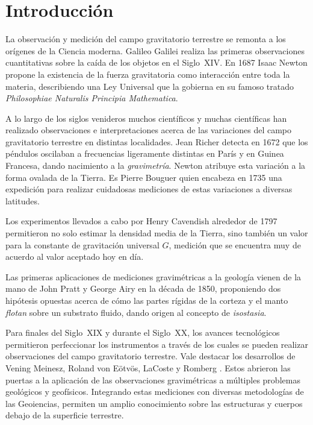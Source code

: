 \chapter{Introducción}

La observación y medición del campo gravitatorio terrestre se remonta a los
orígenes de la Ciencia moderna. Galileo Galilei realiza las primeras
observaciones cuantitativas sobre la caída de los objetos en el Siglo~XIV. En
1687 Isaac Newton propone la existencia de la fuerza gravitatoria como
interacción entre toda la materia, describiendo una Ley Universal que la
gobierna en su famoso tratado \emph{Philosophiae Naturalis Principia
Mathematica}.

A lo largo de los siglos venideros muchos científicos y muchas científicas
han realizado observaciones e interpretaciones acerca de las variaciones del
campo gravitatorio terrestre en distintas localidades. Jean Richer detecta en
1672 que los péndulos oscilaban a frecuencias ligeramente distintas en París
y en Guinea Francesa, dando nacimiento a la \emph{gravimetría}. Newton atribuye
esta variación a la forma ovalada de la Tierra. Es Pierre Bouguer quien
encabeza en 1735 una expedición para realizar cuidadosas mediciones de estas
variaciones a diversas latitudes.

Los experimentos llevados a cabo por Henry Cavendish alrededor de 1797
permitieron no solo estimar la densidad media de la Tierra, sino también un
valor para la constante de gravitación universal $G$, medición que se encuentra
muy de acuerdo al valor aceptado hoy en día.

Las primeras aplicaciones de mediciones gravimétricas a la geología
vienen de la mano de John Pratt y George Airy en la década de 1850, proponiendo
dos hipótesis opuestas acerca de cómo las partes rígidas de la corteza y el
manto \emph{flotan} sobre un substrato fluido, dando origen al concepto de
\emph{isostasia}.

Para finales del Siglo~XIX y durante el Siglo~XX, los avances tecnológicos
permitieron perfeccionar los instrumentos a través de los cuales se pueden
realizar observaciones del campo gravitatorio terrestre. Vale destacar los
desarrollos de Vening Meinesz, Roland von Eötvös, LaCoste y Romberg
\citep{blakely1995}.
Estos abrieron las puertas a la aplicación de las observaciones gravimétricas
a múltiples problemas geológicos y geofísicos. Integrando estas mediciones con
diversas metodologías de las Geoiencias, permiten un amplio conocimiento sobre
las estructuras y cuerpos debajo de la superficie terrestre.

